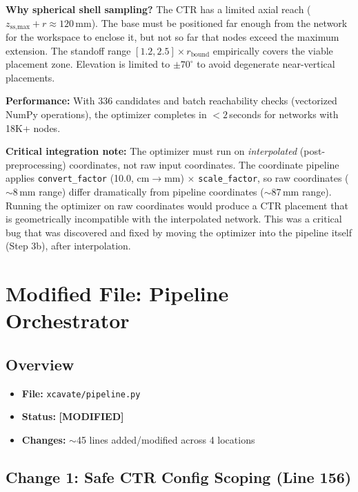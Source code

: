 \documentclass[11pt,a4paper]{article}
\newcommand{\filename}[1]{\texttt{\textcolor{accentblue}{#1}}}
\newcommand{\modlabel}{\textcolor{modifiedfile}{\textbf{[MODIFIED]}}}
\begin{document}
\textbf{Why spherical shell sampling?} The CTR has a limited axial reach ($z_\text{ss,max} + r \approx 120$\,mm). The base must be positioned far enough from the network for the workspace to enclose it, but not so far that nodes exceed the maximum extension. The standoff range $[1.2, 2.5] \times r_\text{bound}$ empirically covers the viable placement zone. Elevation is limited to $\pm 70^\circ$ to avoid degenerate near-vertical placements.

\textbf{Performance:} With 336 candidates and batch reachability checks (vectorized NumPy operations), the optimizer completes in $<2$\,seconds for networks with 18K+ nodes.

\textbf{Critical integration note:} The optimizer must run on \emph{interpolated} (post-preprocessing) coordinates, not raw input coordinates. The coordinate pipeline applies \texttt{convert\_factor} (10.0, cm$\to$mm) $\times$ \texttt{scale\_factor}, so raw coordinates ($\sim$8\,mm range) differ dramatically from pipeline coordinates ($\sim$87\,mm range). Running the optimizer on raw coordinates would produce a CTR placement that is geometrically incompatible with the interpolated network. This was a critical bug that was discovered and fixed by moving the optimizer into the pipeline itself (Step 3b), after interpolation.

\section{Modified File: Pipeline Orchestrator}
\label{sec:pipeline}

\subsection{Overview}

\begin{itemize}[nosep]
    \item \textbf{File:} \filename{xcavate/pipeline.py}
    \item \textbf{Status:} \modlabel
    \item \textbf{Changes:} $\sim$45 lines added/modified across 4 locations
\end{itemize}

\subsection{Change 1: Safe CTR Config Scoping (Line 156)}
\end{document}
